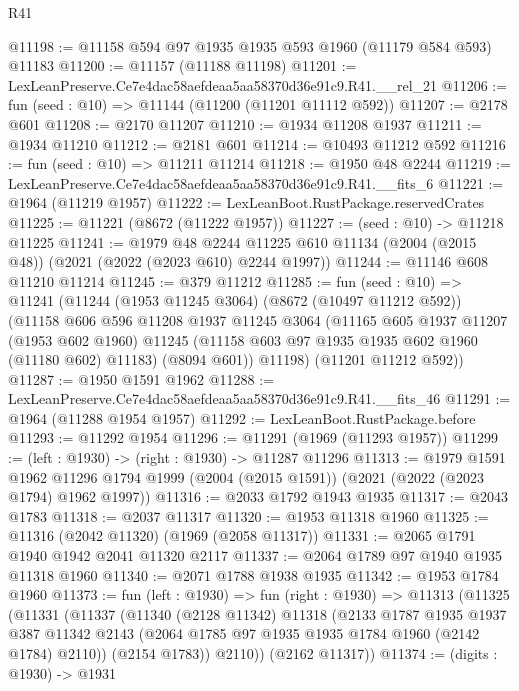 \begin{lexlean}{R41}
\begin{coremodule}
@11198 := @11158 @594 @97 @1935 @1935 @593 @1960 (@11179 @584 @593) @11183
@11200 := @11157 (@11188 @11198)
@11201 := LexLeanPreserve.Ce7e4dac58aefdeaa5aa58370d36e91c9.R41.__rel_21
@11206 := fun (seed : @10) => @11144 (@11200 (@11201 @11112 @592))
@11207 := @2178 @601
@11208 := @2170 @11207
@11210 := @1934 @11208 @1937
@11211 := @1934 @11210
@11212 := @2181 @601
@11214 := @10493 @11212 @592
@11216 := fun (seed : @10) => @11211 @11214
@11218 := @1950 @48 @2244
@11219 := LexLeanPreserve.Ce7e4dac58aefdeaa5aa58370d36e91c9.R41.__fits_6
@11221 := @1964 (@11219 @1957)
@11222 := LexLeanBoot.RustPackage.reservedCrates
@11225 := @11221 (@8672 (@11222 @1957))
@11227 := (seed : @10) -> @11218 @11225
@11241 := @1979
    @48
    @2244
    @11225
    @610
    @11134
    (@2004 (@2015 @48))
    (@2021 (@2022 (@2023 @610) @2244 @1997))
@11244 := @11146 @608 @11210 @11214
@11245 := @379 @11212
@11285 := fun (seed : @10) =>
  @11241
    (@11244
      (@1953 @11245 @3064)
      (@8672 (@10497 @11212 @592))
      (@11158
        @606
        @596
        @11208
        @1937
        @11245
        @3064
        (@11165
          @605
          @1937
          @11207
          (@1953 @602 @1960)
          @11245
          (@11158 @603 @97 @1935 @1935 @602 @1960 (@11180 @602) @11183)
          (@8094 @601))
        @11198)
      (@11201 @11212 @592))
@11287 := @1950 @1591 @1962
@11288 := LexLeanPreserve.Ce7e4dac58aefdeaa5aa58370d36e91c9.R41.__fits_46
@11291 := @1964 (@11288 @1954 @1957)
@11292 := LexLeanBoot.RustPackage.before
@11293 := @11292 @1954
@11296 := @11291 (@1969 (@11293 @1957))
@11299 := (left : @1930) -> (right : @1930) -> @11287 @11296
@11313 := @1979
    @1591
    @1962
    @11296
    @1794
    @1999
    (@2004 (@2015 @1591))
    (@2021 (@2022 (@2023 @1794) @1962 @1997))
@11316 := @2033 @1792 @1943 @1935
@11317 := @2043 @1783
@11318 := @2037 @11317
@11320 := @1953 @11318 @1960
@11325 := @11316 (@2042 @11320) (@1969 (@2058 @11317))
@11331 := @2065 @1791 @1940 @1942 @2041 @11320 @2117
@11337 := @2064 @1789 @97 @1940 @1935 @11318 @1960
@11340 := @2071 @1788 @1938 @1935
@11342 := @1953 @1784 @1960
@11373 := fun (left : @1930) =>
  fun (right : @1930) =>
  @11313
    (@11325
      (@11331
        (@11337
          (@11340
            (@2128 @11342)
            @11318
            (@2133
              @1787
              @1935
              @1937
              @387
              @11342
              @2143
              (@2064 @1785 @97 @1935 @1935 @1784 @1960 (@2142 @1784) @2110))
            (@2154 @1783))
          @2110))
      (@2162 @11317))
@11374 := (digits : @1930) -> @1931

\end{coremodule}
\end{lexlean}
